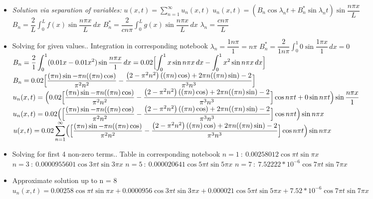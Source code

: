 \documentclass[10pt]{article}
\begin{document}
\begin{itemize}
    \item \textit{Solution via separation of variables:} $ \displaystyle u(x,t) = \sum_{n = 1}^{\infty} u_n(x,t) $
    \subitem $ \displaystyle u_n(x,t) = (B_{n}\cos{\lambda_{n}t} + B^{*}_{n}\sin{\lambda_{n}t})\sin{\dfrac{n\pi x}{L}} $
    \subitem $ \displaystyle B_{n} =  \dfrac{2}{L} \int_{0}^{L} f(x)\sin{\dfrac{n\pi x}{L}} \,dx $
    \subitem $ \displaystyle B^{*}_{n} = \dfrac{2}{cn\pi} \int_{0}^{L} g(x)\sin{\dfrac{n\pi x}{L}} \,dx $
    \subitem $ \displaystyle \lambda_{n} = \dfrac{cn\pi}{L} $
    \item Solving for given values.. Integration in corresponding notebook
    \subitem $ \displaystyle \lambda_{n} = \dfrac{1n\pi}{1} = n\pi $
    \subitem $ \displaystyle B^{*}_{n} = \dfrac{2}{1n\pi} \int_{0}^{1} 0\sin{\dfrac{1\pi x}{1}} \,dx = 0 $
    \subitem $ \displaystyle B_{n} = \dfrac{2}{1} \int_{0}^{1} (0.01x - 0.01x^{2})\sin{\dfrac{n\pi x}{1}} \,dx = 0.02 \Bigl[ \int_{0}^{1} x\sin{n\pi x} \,dx - \int_{0}^{1} x^{2}\sin{n\pi x} \,dx \Bigr] $
    \subitem $ \displaystyle B_{n} = 0.02\Bigl[\dfrac{(\pi  n) \sin -\pi  n ((\pi  n) \cos )}{\pi ^2 n^2}-\dfrac{\left(2-\pi ^2 n^2\right) ((\pi  n) \cos )+2 \pi  n ((\pi  n) \sin )-2}{\pi ^3 n^3}\Bigr] $
    \subitem $ \displaystyle u_n(x,t) = \Bigl(0.02\Bigl[\dfrac{(\pi  n) \sin -\pi  n ((\pi  n) \cos )}{\pi ^2 n^2}-\dfrac{\left(2-\pi ^2 n^2\right) ((\pi  n) \cos )+2 \pi  n ((\pi  n) \sin )-2}{\pi ^3 n^3}\Bigr]\cos{n\pi t} + 0\sin{n\pi t}\Bigr)\sin{\dfrac{n\pi x}{1}} $
    \subitem $ \displaystyle u_n(x,t) = 0.02\Bigl(\Bigl[\dfrac{(\pi  n) \sin -\pi  n ((\pi  n) \cos )}{\pi ^2 n^2}-\dfrac{\left(2-\pi ^2 n^2\right) ((\pi  n) \cos )+2 \pi  n ((\pi  n) \sin )-2}{\pi ^3 n^3}\Bigr]\cos{n\pi t}\Bigr)\sin{n\pi x} $
    \subitem $ \displaystyle u(x,t) = 0.02 \sum_{n = 1}^{\infty} \Bigl(\Bigl[\dfrac{(\pi  n) \sin -\pi  n ((\pi  n) \cos )}{\pi ^2 n^2}-\dfrac{\left(2-\pi ^2 n^2\right) ((\pi  n) \cos )+2 \pi  n ((\pi  n) \sin )-2}{\pi ^3 n^3}\Bigr]\cos{n\pi t}\Bigr)\sin{n\pi x} $
    \item Solving for first 4 non-zero terms.. Table in corresponding notebook
    \subitem $ n = 1 \ : \ 0.00258012\cos{\pi t}\sin{\pi x} $
    \subitem $ n = 3 \ : \ 0.0000955601\cos{3\pi t}\sin{3\pi x} $
    \subitem $ n = 5 \ : \ 0.000020641\cos{5\pi t}\sin{5\pi x} $
    \subitem $ n = 7 \ : \ 7.52222*10^{-6}\cos{7\pi t}\sin{7\pi x} $
    \item Approximate solution up to n = 8
    \subitem  $ \displaystyle u_n(x,t) = 0.00258\cos{\pi t}\sin{\pi x} + 0.0000956\cos{3\pi t}\sin{3\pi x} + 0.000021\cos{5\pi t}\sin{5\pi x} + 7.52*10^{-6}\cos{7\pi t}\sin{7\pi x} $
\end{itemize}
\end{document}
